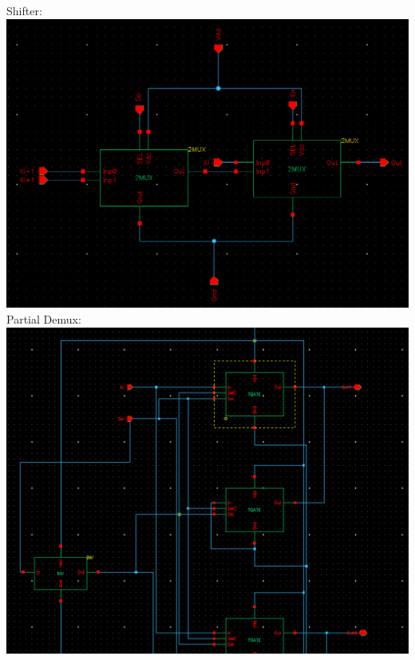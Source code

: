 \documentclass[12pt]{article}
\begin{document}
	 \newline \newline \newline \newline \newline \newline \newline \newline
	Shifter:\\
 	 \includegraphics[scale=0.3]{shift.png} \\
	 \newline \newline
	Partial Demux:\\
  	\includegraphics[scale=0.4]{demuxpart.png} \\
\end{document}
